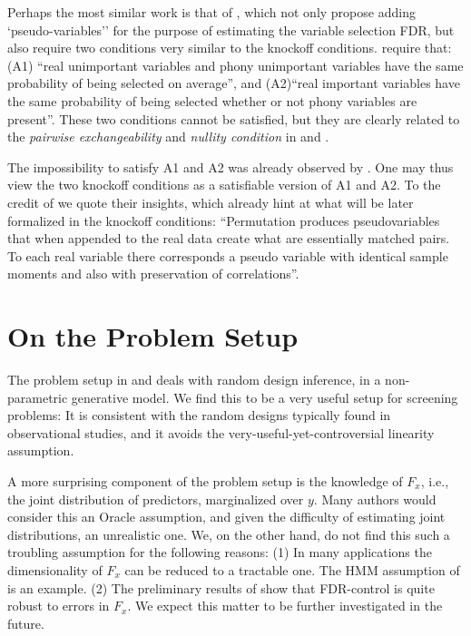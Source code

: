 \documentclass[article,lineno]{biometrika}
\begin{document}
Perhaps the most similar work is that of \cite{WuControllingVariableSelection2007}, which not only propose adding `pseudo-variables'' for the purpose of estimating the variable selection FDR, but also require two conditions very similar to the knockoff conditions. 
\cite{WuControllingVariableSelection2007} require that:
(A1) ``real unimportant variables and phony unimportant variables have the same probability of being selected on average'', and (A2)``real important variables have the same probability of being selected whether or not phony variables are present''.
These two conditions cannot be satisfied, but they are clearly related to the \emph{pairwise exchangeability} and \emph{nullity condition} in \cite{SesiaGenehuntinghidden} and \cite{CandesPanninggoldmodelX2018}.

The impossibility to satisfy A1 and A2 was already observed by \cite{WuControllingVariableSelection2007}. 
One may thus view the two knockoff conditions as a satisfiable version of A1 and A2.
To the credit of \cite{WuControllingVariableSelection2007} we quote their insights, which already hint at what will be later formalized in the knockoff conditions:
``Permutation produces pseudovariables that when appended to the real data create what
are essentially matched pairs. To each real variable there corresponds a pseudo variable with identical sample moments and also with preservation of correlations''.




\section{On the Problem Setup}

The problem setup in \cite{CandesPanninggoldmodelX2018} and \cite{SesiaGenehuntinghidden} deals with random design inference, in a non-parametric generative model.
We find this to be a very useful setup for screening problems:
It is consistent with the random designs typically found in observational studies, and it avoids the very-useful-yet-controversial linearity assumption. 

A more surprising component of the problem setup is the knowledge of $F_x$, i.e., the joint distribution of predictors, marginalized over $y$. 
Many authors would consider this an Oracle assumption, and given the difficulty of estimating joint distributions, an unrealistic one. 
We, on the other hand, do not find this such a troubling assumption for the following reasons:
(1) In many applications the dimensionality of $F_x$ can be reduced to a tractable one. The HMM assumption of \cite{SesiaGenehuntinghidden} is an example. 
(2) The preliminary results of \cite{CandesPanninggoldmodelX2018} show that FDR-control is quite robust to errors in $F_x$. We expect this matter to be further investigated in the future. 
\end{document}
